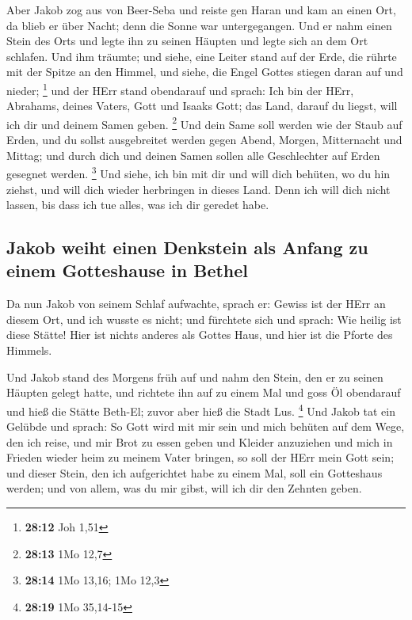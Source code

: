  Aber Jakob zog aus von Beer-Seba und reiste gen Haran
 und kam an einen Ort, da blieb er über Nacht; denn die
Sonne war untergegangen. Und er nahm einen Stein des Orts und legte ihn
zu seinen Häupten und legte sich an dem Ort schlafen. 
Und ihm träumte; und siehe, eine Leiter stand auf der Erde, die rührte
mit der Spitze an den Himmel, und siehe, die Engel Gottes stiegen daran
auf und nieder; \footnote{\textbf{28:12} Joh 1,51}  und
der HErr stand obendarauf und sprach: Ich bin der HErr, Abrahams, deines
Vaters, Gott und Isaaks Gott; das Land, darauf du liegst, will ich dir
und deinem Samen geben. \footnote{\textbf{28:13} 1Mo 12,7}
 Und dein Same soll werden wie der Staub auf Erden, und
du sollst ausgebreitet werden gegen Abend, Morgen, Mitternacht und
Mittag; und durch dich und deinen Samen sollen alle Geschlechter auf
Erden gesegnet werden. \footnote{\textbf{28:14} 1Mo 13,16; 1Mo 12,3}
 Und siehe, ich bin mit dir und will dich behüten, wo du
hin ziehst, und will dich wieder herbringen in dieses Land. Denn ich
will dich nicht lassen, bis dass ich tue alles, was ich dir geredet
habe.

\hypertarget{jakob-weiht-einen-denkstein-als-anfang-zu-einem-gotteshause-in-bethel}{%
\subsection{Jakob weiht einen Denkstein als Anfang zu einem Gotteshause
in
Bethel}\label{jakob-weiht-einen-denkstein-als-anfang-zu-einem-gotteshause-in-bethel}}

 Da nun Jakob von seinem Schlaf aufwachte, sprach er:
Gewiss ist der HErr an diesem Ort, und ich wusste es nicht;
 und fürchtete sich und sprach: Wie heilig ist diese
Stätte! Hier ist nichts anderes als Gottes Haus, und hier ist die Pforte
des Himmels.

 Und Jakob stand des Morgens früh auf und nahm den Stein,
den er zu seinen Häupten gelegt hatte, und richtete ihn auf zu einem Mal
und goss Öl obendarauf  und hieß die Stätte Beth-El;
zuvor aber hieß die Stadt Lus. \footnote{\textbf{28:19} 1Mo 35,14-15}
 Und Jakob tat ein Gelübde und sprach: So Gott wird mit
mir sein und mich behüten auf dem Wege, den ich reise, und mir Brot zu
essen geben und Kleider anzuziehen  und mich in Frieden
wieder heim zu meinem Vater bringen, so soll der HErr mein Gott sein;
 und dieser Stein, den ich aufgerichtet habe zu einem
Mal, soll ein Gotteshaus werden; und von allem, was du mir gibst, will
ich dir den Zehnten geben.

